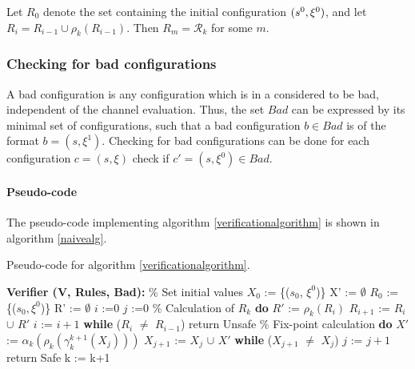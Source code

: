 Let $R_0$ denote the set containing the initial configuration $(s^0, \xi^0)$, and let $R_i = R_{i-1} \cup \rho_k(R_{i-1})$. Then $R_m = \mathcal{R}_k$ for some $m$.

\subsubsection{Checking for bad configurations}
\label{part3}
A bad configuration is any configuration which is in a  considered to be bad, independent of the channel evaluation. Thus, the set $Bad$ can be expressed by its minimal set of configurations, such that a bad configuration $b \in Bad$ is of the format $b = (s, \xi^1)$. Checking for bad configurations can be done for each configuration $c = (s, \xi)$ check if $c' = (s, \xi^0) \in Bad$.


\paragraph{Pseudo-code}
The pseudo-code implementing algorithm \ref{verificationalgorithm} is shown in algorithm \ref{naivealg}. 

\begin{algorithm}
  \caption{Pseudo-code for algorithm \ref{verificationalgorithm}.}
	\label{naivealg}
  \begin{algorithmic}[1]
    \State \textbf{Verifier (V, Rules, Bad):}
	\State \% Set initial values
	\State $X_0$ := \{($s_0$, $\xi^0$)\}
	\State X' := $\emptyset$
	\State $R_0$ := \{($s_0, \xi^0$)\}
	\State R' := $\emptyset$
	\State $i$ :=$0$
	\State $j$ :=$0$
	\State
	\State \% Calculation of $R_k$
	\State \textbf{do}
        \State \hspace{10pt} $R'$ := $\rho_k(R_i)$
	\State \hspace{10pt} $R_{i+1}$ := $R_i$ $\cup$ $R'$
	\State \hspace{10pt} $i$ := $i+1$
	\State \textbf{while} ($R_i$ $\neq$ $R_{i-1}$)
        \State return Unsafe
        \EndIf 
	\State 
	\State \% Fix-point calculation
	\State \textbf{do}
        \State \hspace{10pt} $X'$ := $\alpha_k(\rho_k(\gamma_k^{k+1}(X_j)))$
	\State \hspace{10pt} $X_{j+1}$ := $X_j$ $\cup$ $X'$
	\State \hspace{10pt} \textbf{while} ($X_{j+1}$ $\neq$ $X_j$)
	\State \hspace{10pt} $j$ := $j+1$
        \State return Safe
        \EndIf
        \State k := k+1
      \EndFor
\end{algorithmic}
\end{algorithm}

